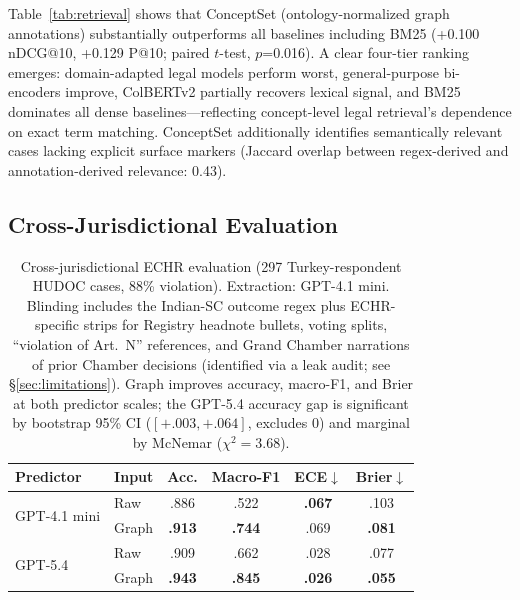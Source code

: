 \documentclass[11pt]{article}
\begin{document}
Table~\ref{tab:retrieval} shows that ConceptSet (ontology-normalized graph annotations) substantially outperforms all baselines including BM25 (+0.100 nDCG@10, +0.129 P@10; paired $t$-test, $p$=0.016). A clear four-tier ranking emerges: domain-adapted legal models perform worst, general-purpose bi-encoders improve, ColBERTv2 partially recovers lexical signal, and BM25 dominates all dense baselines---reflecting concept-level legal retrieval's dependence on exact term matching. ConceptSet additionally identifies semantically relevant cases lacking explicit surface markers (Jaccard overlap between regex-derived and annotation-derived relevance: 0.43).

\subsection{Cross-Jurisdictional Evaluation}
\label{sec:echr}

\begin{table}[t]
\small
\centering
\caption{Cross-jurisdictional ECHR evaluation (297 Turkey-respondent HUDOC cases, 88\% violation). Extraction: GPT-4.1 mini. Blinding includes the Indian-SC outcome regex plus ECHR-specific strips for Registry headnote bullets, voting splits, ``violation of Art.~N'' references, and Grand Chamber narrations of prior Chamber decisions (identified via a leak audit; see \S\ref{sec:limitations}). Graph improves accuracy, macro-F1, and Brier at both predictor scales; the GPT-5.4 accuracy gap is significant by bootstrap 95\% CI ($[+.003,+.064]$, excludes 0) and marginal by McNemar ($\chi^2{=}3.68$).}
\label{tab:echr}
\begin{tabular}{llcccc}
\toprule
Predictor & Input & Acc. & Macro-F1 & ECE$\downarrow$ & Brier$\downarrow$ \\
\midrule
\multirow{2}{*}{GPT-4.1 mini} & Raw   & .886 & .522 & \textbf{.067} & .103 \\
                              & Graph & \textbf{.913} & \textbf{.744} & .069 & \textbf{.081} \\
\midrule
\multirow{2}{*}{GPT-5.4}      & Raw   & .909 & .662 & .028 & .077 \\
                              & Graph & \textbf{.943} & \textbf{.845} & \textbf{.026} & \textbf{.055} \\
\bottomrule
\end{tabular}
\end{table}
\end{document}
